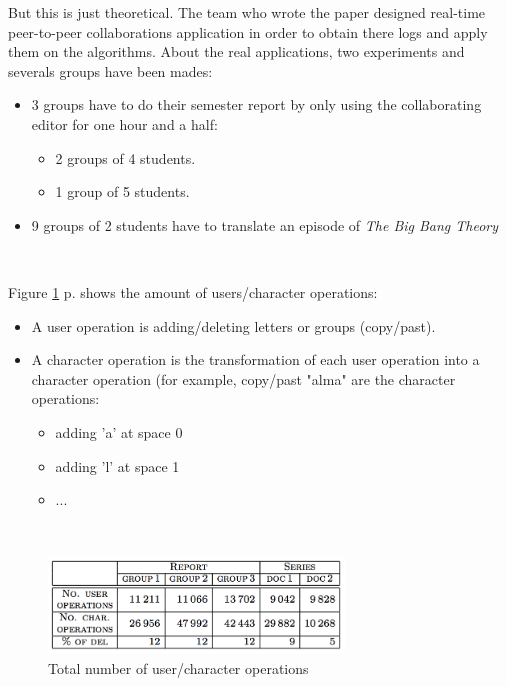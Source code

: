 But this is just theoretical. The team who wrote the paper designed real-time peer-to-peer collaborations application in order to obtain there logs and apply them on the algorithms. About the real applications, two experiments and severals groups have been mades:
\begin{itemize}
	\item 3 groups have to do their semester report by only using the collaborating editor for one hour and a half:
		\begin{itemize}
			\item 2 groups of 4 students.
			\item 1 group of 5 students.
		\end{itemize}
	\item 9 groups of 2 students have to translate an episode of \emph{The Big Bang Theory}
\end{itemize}~

Figure \ref{fig:operations} p.\pageref{fig:operations} shows the amount of users/character operations:
\begin{itemize}
	\item A user operation is adding/deleting letters or groups (copy/past).
	\item A character operation is the transformation of each user operation into a character operation (for example, copy/past "alma" are the character operations: \begin{itemize}
					\item adding 'a' at space 0
					\item adding 'l' at space 1
					\item ...
				\end{itemize}
\end{itemize}~

\begin{figure}[h]
  \center
  \includegraphics[width=0.7\textwidth]{includes/operations.png}
  \caption{Total number of user/character operations}
  \label{fig:operations}
\end{figure}